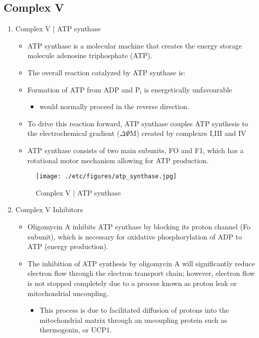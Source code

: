 \documentclass{scrartcl}
\begin{document}
\subsection{Complex V}
\label{sec:orgbd4098f}
\begin{enumerate}
\item Complex V | ATP synthase
\label{sec:org6aadc37}

\begin{itemize}
\item ATP synthase is a molecular machine that creates the energy storage
molecule adenosine triphosphate (ATP).

\item The overall reaction catalyzed by ATP synthase is:
\end{itemize}

{\small{}}


\begin{itemize}
\item Formation of ATP from ADP and P\(_{\text{i}}\) is energetically unfavourable
\begin{itemize}
\item would normally proceed in the reverse direction.
\end{itemize}

\item To drive this reaction forward, ATP synthase couples ATP synthesis
to the electrochemical gradient (\(\Delta \Psi\)M) created by complexes
I,III and IV

\item ATP synthase consists of two main subunits, FO and F1, which has a
rotational motor mechanism allowing for ATP production.
\end{itemize}

\begin{figure}[htbp]
\centering
\texttt{[image: ./etc/figures/atp\_synthase.jpg]}
\caption{\label{fig:org6b15dce}
Complex V | ATP synthase}
\end{figure}


{\small{}}

\item Complex V Inhibitors
\label{sec:org35fda20}
\begin{itemize}
\item Oligomycin A inhibits ATP synthase by blocking its proton channel
(Fo subunit), which is necessary for oxidative phosphorylation of
ADP to ATP (energy production).
\item The inhibition of ATP synthesis by oligomycin A will significantly
reduce electron flow through the electron transport chain; however,
electron flow is not stopped completely due to a process known as
proton leak or mitochondrial uncoupling.
\begin{itemize}
\item This process is due to facilitated diffusion of protons into the
mitochondrial matrix through an uncoupling protein such as
thermogenin, or UCP1.
\end{itemize}


\end{itemize}
\end{enumerate}
\end{document}
